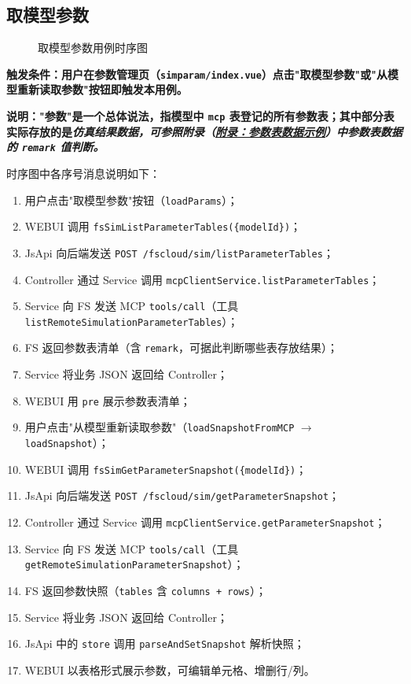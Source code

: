 \subsection{取模型参数}
\begin{figure}[!h]
	\centering
	\resizebox{1.0\linewidth}{!}{}
	\caption{取模型参数用例时序图}\label{fig:getModelParams}
\end{figure}
\bf{触发条件}：用户在参数管理页（\texttt{simparam/index.vue}）点击"取模型参数"或"从模型重新读取参数"按钮即触发本用例。\par \bf{说明}："参数"是一个总体说法，指模型中 \texttt{mcp} 表登记的所有参数表；其中部分表实际存放的是\it{仿真结果}数据，可参照附录（\hyperref[sec:appendix]{附录：参数表数据示例}）中参数表数据的 \texttt{remark} 值判断。\par 时序图中各序号消息说明如下：
\begin{enumerate}[label=\arabic*)]
	\item 用户点击"取模型参数"按钮（\texttt{loadParams}）；
	\item WEBUI 调用 \texttt{fsSimListParameterTables(\{modelId\})}；
	\item JsApi 向后端发送 \texttt{POST /fscloud/sim/listParameterTables}；
	\item Controller 通过 Service 调用 \texttt{mcpClientService.listParameterTables}；
	\item Service 向 FS 发送 MCP \texttt{tools/call}（工具 \texttt{listRemoteSimulationParameterTables}）；
	\item FS 返回参数表清单（含 \texttt{remark}，可据此判断哪些表存放结果）；
	\item Service 将业务 JSON 返回给 Controller；
	\item WEBUI 用 \texttt{pre} 展示参数表清单；
	\item 用户点击"从模型重新读取参数"（\texttt{loadSnapshotFromMCP} $\rightarrow$ \texttt{loadSnapshot}）；
	\item WEBUI 调用 \texttt{fsSimGetParameterSnapshot(\{modelId\})}；
	\item JsApi 向后端发送 \texttt{POST /fscloud/sim/getParameterSnapshot}；
	\item Controller 通过 Service 调用 \texttt{mcpClientService.getParameterSnapshot}；
	\item Service 向 FS 发送 MCP \texttt{tools/call}（工具 \texttt{getRemoteSimulationParameterSnapshot}）；
	\item FS 返回参数快照（\texttt{tables} 含 \texttt{columns + rows}）；
	\item Service 将业务 JSON 返回给 Controller；
	\item JsApi 中的 \texttt{store} 调用 \texttt{parseAndSetSnapshot} 解析快照；
	\item WEBUI 以表格形式展示参数，可编辑单元格、增删行/列。
\end{enumerate}
\newpage
